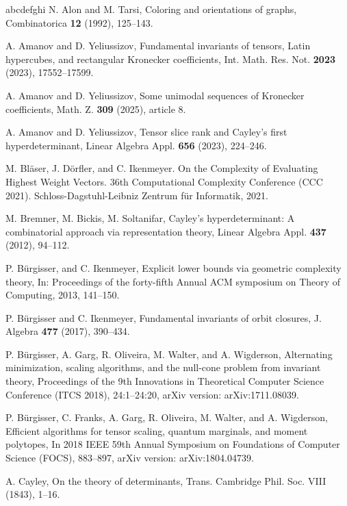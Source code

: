 \documentclass[12pt, reqno]{amsart}
\theoremstyle{definition}
\begin{document}
\begin{thebibliography}{abcdefghi}
N. Alon and M. Tarsi, Coloring and orientations of graphs, Combinatorica {\bf 12} (1992), 125--143.

A. Amanov and D. Yeliussizov, Fundamental invariants of tensors, Latin hypercubes, and rectangular Kronecker coefficients, Int. Math. Res. Not. {\bf 2023} (2023), 17552--17599. %

A. Amanov and D. Yeliussizov, Some unimodal sequences of Kronecker coefficients, Math. Z. {\bf 309} (2025), article 8.

A. Amanov and D. Yeliussizov, Tensor slice rank and Cayley's first hyperdeterminant, Linear Algebra Appl. {\bf 656} (2023), 224--246.

M. Bläser, J. Dörfler, and C. Ikenmeyer. On the Complexity of Evaluating Highest Weight Vectors. 36th Computational Complexity Conference (CCC 2021). Schloss-Dagstuhl-Leibniz Zentrum für Informatik, 2021.


M. Bremner, M. Bickis, M. Soltanifar, Cayley’s hyperdeterminant: A combinatorial approach via representation theory, Linear Algebra Appl. {\bf 437} (2012), 94--112.

P. B\"urgisser, and C. Ikenmeyer, Explicit lower bounds via geometric complexity theory, In: Proceedings of the forty-fifth Annual ACM symposium on Theory of Computing, 2013, 141--150.

P. B\"urgisser and C. Ikenmeyer, Fundamental invariants of orbit closures, J. Algebra {\bf 477} (2017), 390--434.

P. B\"urgisser, A. Garg, R. Oliveira, M. Walter, and A. Wigderson, Alternating minimization, scaling algorithms, and the null-cone problem from invariant theory, Proceedings of the 9th Innovations in Theoretical Computer Science Conference (ITCS 2018), 24:1--24:20, 
arXiv version: arXiv:1711.08039.

P. B\"urgisser, C. Franks, A. Garg, R. Oliveira, M. Walter, and A. Wigderson, Efficient algorithms for tensor scaling, quantum marginals, and moment polytopes, 
In 2018 IEEE 59th Annual Symposium on Foundations of Computer Science (FOCS), 883--897,
arXiv version: arXiv:1804.04739.

A. Cayley, On the theory of determinants, Trans. Cambridge Phil. Soc. VIII (1843), 1--16.


\end{thebibliography}
\end{document}
